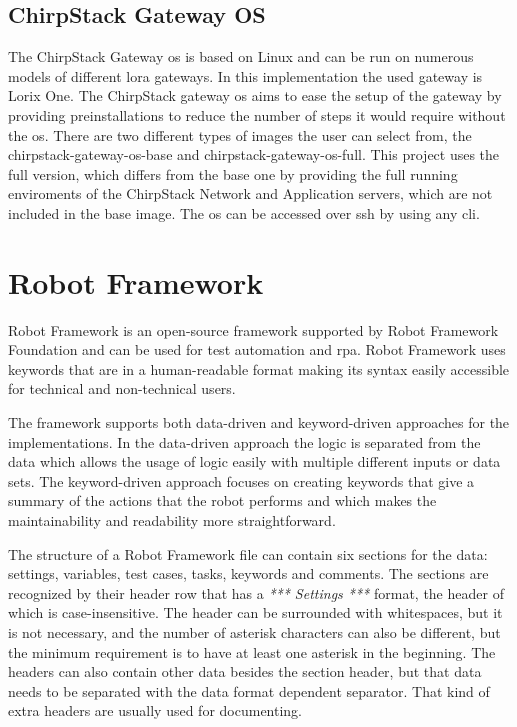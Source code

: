 \subsection{ChirpStack Gateway OS}
The ChirpStack Gateway \gls{os} is based on Linux and can be run on numerous models of different \gls{lora} gateways.
In this implementation the used gateway is Lorix One.
The ChirpStack gateway \gls{os} aims to ease the setup of the gateway by providing preinstallations to reduce the number of steps it would require without the \gls{os}.
There are two different types of images the user can select from, the chirpstack-gateway-os-base and chirpstack-gateway-os-full.
This project uses the full version, which differs from the base one by providing the full running enviroments of the ChirpStack Network and Application servers, which are not included in the base image.
The \gls{os} can be accessed over \gls{ssh} by using any \gls{cli}.
\cite{chirpstack:gatewayOS}


\section{Robot Framework}
Robot Framework is an open-source framework supported by Robot Framework Foundation and can be used for test automation and \gls{rpa}.
Robot Framework uses keywords that are in a human-readable format making its syntax easily accessible for technical and non-technical users.

\clearpage

The framework supports both data-driven and keyword-driven approaches for the implementations.
In the data-driven approach the logic is separated from the data which allows the usage of logic easily with multiple different inputs or data sets.
The keyword-driven approach focuses on creating keywords that give a summary of the actions that the robot performs and which makes the maintainability and readability more straightforward.

The structure of a Robot Framework file can contain six sections for the data: settings, variables, test cases, tasks, keywords and comments.
The sections are recognized by their header row that has a \textit{*** Settings ***} format, the header of which is case-insensitive. The header can be surrounded with whitespaces, but it is not necessary, and the number of asterisk characters can also be different, but the minimum requirement is to have at least one asterisk in the beginning.
The headers can also contain other data besides the section header, but that data needs to be separated with the data format dependent separator.
That kind of extra headers are usually used for documenting.

